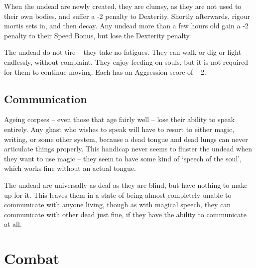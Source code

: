 \begin{multicols}{2}
When the undead are newly created, they are clumsy, as they are not used to their own bodies, and suffer a -2 penalty to Dexterity.
Shortly afterwards, rigour mortis sets in, and then decay.
Any undead more than a few hours old gain a -2 penalty to their Speed Bonus, but lose the Dexterity penalty.

The undead do not tire -- they take no \glspl{fatigue}.
They can walk or dig or fight endlessly, without complaint.
They enjoy feeding on souls, but it is not required for them to continue moving.
Each has an Aggression score of +2.

\subsection{Communication}

Ageing corpses -- even those that age fairly well -- lose their ability to speak entirely.
Any ghast who wishes to speak will have to resort to either magic, writing, or some other system, because a dead tongue and dead lungs can never articulate things properly.
This handicap never seems to fluster the undead when they want to use magic -- they seem to have some kind of `speech of the soul', which works fine without an actual tongue.

The undead are universally as deaf as they are blind, but have nothing to make up for it.
This leaves them in a state of being almost completely unable to communicate with anyone living, though as with magical speech, they can communicate with other dead just fine, if they have the ability to communicate at all.

\end{multicols}

\section{Combat}

